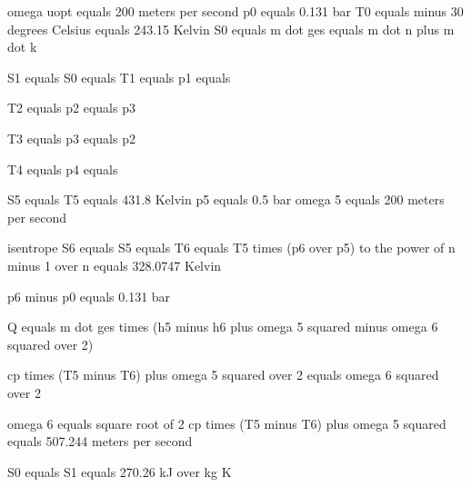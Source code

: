 omega uopt equals 200 meters per second  
p0 equals 0.131 bar  
T0 equals minus 30 degrees Celsius equals 243.15 Kelvin  
S0 equals  
m dot ges equals m dot n plus m dot k  

S1 equals S0 equals  
T1 equals  
p1 equals  

T2 equals  
p2 equals p3  

T3 equals  
p3 equals p2  

T4 equals  
p4 equals  

S5 equals  
T5 equals 431.8 Kelvin  
p5 equals 0.5 bar  
omega 5 equals 200 meters per second  

isentrope S6 equals S5 equals  
T6 equals T5 times (p6 over p5) to the power of n minus 1 over n equals 328.0747 Kelvin  

p6 minus p0 equals 0.131 bar  

Q equals m dot ges times (h5 minus h6 plus omega 5 squared minus omega 6 squared over 2)  

cp times (T5 minus T6) plus omega 5 squared over 2 equals omega 6 squared over 2  

omega 6 equals square root of 2 cp times (T5 minus T6) plus omega 5 squared equals 507.244 meters per second  

S0 equals S1 equals 270.26 kJ over kg K